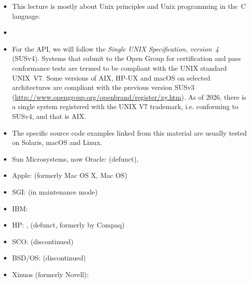 \pagebreak

\begin{slide}
\end{slide}

\begin{itemize}
\item This lecture is mostly about Unix principles and Unix programming in the~C
language.
\item {}
\item For the API, we will follow the \emph{Single UNIX Specification,
version~4} (SUSv4). Systems that submit to the Open Group for certification and
pass conformance tests are termed to be compliant with the UNIX standard
UNIX~V7.  Some versions of AIX, HP-UX and macOS on selected architectures
are compliant with the previous version SUSv3
(\url{http://www.opengroup.org/openbrand/register/xy.htm}).
As of 2026, there is a single system registered with the UNIX V7 trademark, i.e.
conforming to SUSv4, and that is AIX.
\item The specific source code examples linked from this material are usually
tested on Solaris, macOS and Linux.
\end{itemize}


\begin{slide}
\end{slide}


\begin{slide}

\begin{itemize}
\item Sun Microsystems, now Oracle:  (defunct), 
\item Apple:  (formerly Mac OS X, Mac OS)
\item SGI:  (in maintenance mode)
\item IBM: 
\item HP: ,  (defunct, formerly by Compaq)
\item SCO:  (discontinued)
\item BSD/OS:  (discontinued)
\item Xinuos (formerly Novell): 
\end{itemize}
\end{slide}

